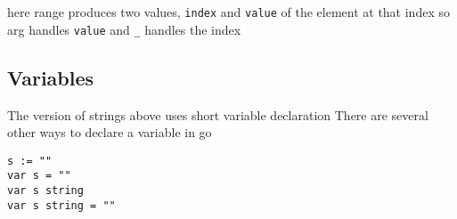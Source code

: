 \documentclass[11pt]{article}
\begin{document}
here range produces two values, \texttt{index} and \texttt{value} of the element at that index
so arg handles \texttt{value} and \texttt{\_} handles the index


\subsection{Variables}
\label{sec:orgb8ae3e4}
The version of strings above uses short variable declaration
There are several other ways to declare a variable in go

\begin{verbatim}
s := ""
var s = ""
var s string
var s string = ""
\end{verbatim}
\end{document}
